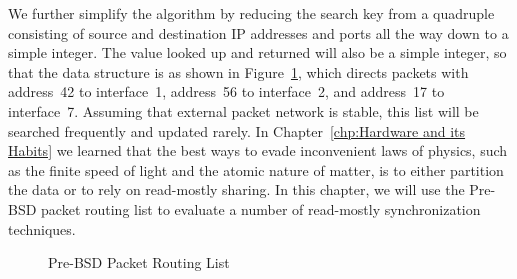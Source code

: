 We further simplify the algorithm by reducing the search key from
a quadruple consisting of source and destination IP addresses and
ports all the way down to a simple integer.
The value looked up and returned will also be a simple integer,
so that the data structure is as shown in
Figure~\ref{fig:defer:Pre-BSD Packet Routing List}, which
directs packets with address~42 to interface~1, address~56 to
interface~2, and address~17 to interface~7.
Assuming that external packet network is stable,
this list will be searched frequently and updated rarely.
In Chapter~\ref{chp:Hardware and its Habits}
we learned that the best ways to evade inconvenient laws of physics, such as
the finite speed of light and the atomic nature of matter, is to
either partition the data or to rely on read-mostly sharing.
In this chapter, we will use the Pre-BSD packet routing
list to evaluate a number of read-mostly synchronization techniques.

\begin{figure}[tb]
\begin{center}
\end{center}
\caption{Pre-BSD Packet Routing List}
\label{fig:defer:Pre-BSD Packet Routing List}
\end{figure}









